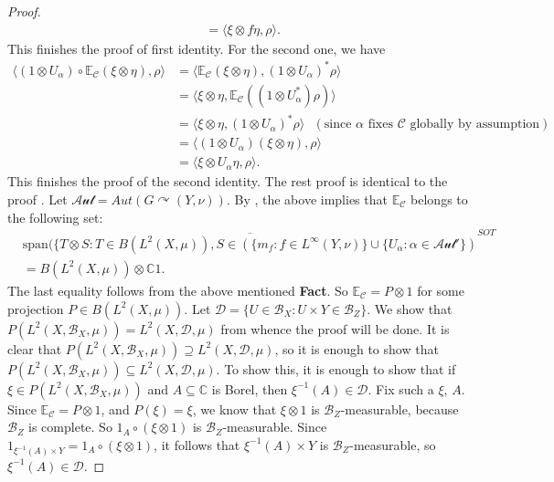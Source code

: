 \documentclass[12pt]{amsart}
\theoremstyle{definition}
\begin{document}
\begin{proof}
\begin{align*}
&=\langle \xi\otimes f\eta, \rho\rangle.
\end{align*}
This finishes the proof of first identity. For the second one, we have
\begin{align*}
\langle (1\otimes U_{\alpha})\circ \mathbb{E}_{\mathcal{C}}(\xi\otimes \eta), \rho\rangle
&=\langle \mathbb{E}_{\mathcal{C}}(\xi\otimes \eta), (1\otimes U_{\alpha})^*\rho\rangle\\
&=\langle \xi\otimes \eta, \mathbb{E}_{\mathcal{C}}((1\otimes U_{\alpha}^*)\rho)\rangle\\
&=\langle \xi\otimes \eta, (1\otimes U_{\alpha})^*\rho\rangle~~~(\text{since $\alpha$ fixes $\mathcal{C}$ globally by assumption})\\
&=\langle (1\otimes U_{\alpha})(\xi\otimes \eta), \rho\rangle\\
&=\langle \xi \otimes U_{\alpha}\eta, \rho\rangle.
\end{align*}
This finishes the proof of the second identity. The rest proof is identical to the proof \cite[Lemma 4.1]{ben-pinsker}. Let 
$\mathcal{Aut}=Aut(G\curvearrowright (Y, \nu)).$
By \cite[Theorem IV. 5.9]{ben-pinsker}, the above implies that $\mathbb{E}_{\mathcal{C}}$ belongs to the following set:
\begin{align*}
&\overline{\text{span}(\{T\otimes S: T\in B(L^2(X,\mu)), S\in (\{m_f: f\in L^{\infty}(Y,\nu)\}\cup \{U_{\alpha}: \alpha\in \mathcal{Aut}'\})}^{SOT}\\
&=B(L^2(X,\mu))\otimes \mathbb{C}1.
\end{align*}
The last equality follows from the above mentioned \textbf{Fact}. So $\mathbb{E}_{\mathcal{C}}=P\otimes 1$ for some projection $P\in B(L^2(X,\mu))$. Let $\mathcal{D}=\{U\in \mathcal{B}_X: U\times Y\in\mathcal{B}_Z\}$. We show that $P(L^2(X,\mathcal{B}_X, \mu))=L^2(X,\mathcal{D},\mu)$ from whence the proof will be done. It is clear that $P(L^2(X,\mathcal{B}_X,\mu))\supseteq L^2(X,\mathcal{D},\mu)$, so it is enough to show that $P(L^2(X,\mathcal{B}_X,\mu))\subseteq L^2(X,\mathcal{D},\mu)$. To show this, it is enough to show that if $\xi\in P(L^2(X,\mathcal{B}_X,\mu))$ and $A\subseteq \mathbb{C}$ is Borel, then $\xi^{-1}(A)\in\mathcal{D}$. Fix such a $\xi$, $A$. Since $\mathbb{E}_{\mathcal{C}}=P\otimes 1$, and $P(\xi)=\xi$, we know that $\xi\otimes 1$ is $\mathcal{B}_Z$-measurable, because $\mathcal{B}_Z$ is complete. So $1_A\circ (\xi\otimes 1)$ is $\mathcal{B}_Z$-measurable. Since $1_{\xi^{-1}(A)\times Y}=1_A\circ (\xi\otimes 1)$, it follows that $\xi^{-1}(A)\times Y$ is $\mathcal{B}_Z$-measurable, so $\xi^{-1}(A)\in\mathcal{D}$.
\end{proof}
\end{document}
